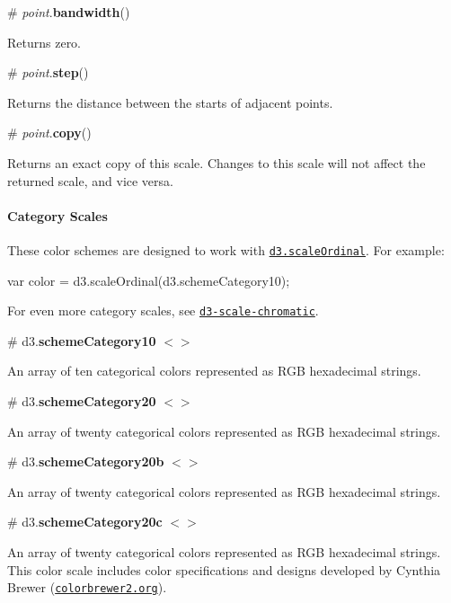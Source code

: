 \label{_point_bandwidth}%
\# {\itshape point}.{\bfseries bandwidth}()

Returns zero.

\label{_point_step}%
\# {\itshape point}.{\bfseries step}()

Returns the distance between the starts of adjacent points.

\label{_point_copy}%
\# {\itshape point}.{\bfseries copy}()

Returns an exact copy of this scale. Changes to this scale will not affect the returned scale, and vice versa.

\paragraph*{Category Scales}

These color schemes are designed to work with \href{#scaleOrdinal}{\tt d3.\+scale\+Ordinal}. For example\+:


\begin{DoxyCode}
var color = d3.scaleOrdinal(d3.schemeCategory10);
\end{DoxyCode}


For even more category scales, see \href{https://github.com/d3/d3-scale-chromatic}{\tt d3-\/scale-\/chromatic}.

\label{_schemeCategory10}%
\# d3.{\bfseries scheme\+Category10} \href{https://github.com/d3/d3-scale/blob/master/src/category10.js}{\tt $<$$>$}



An array of ten categorical colors represented as R\+GB hexadecimal strings.

\label{_schemeCategory20}%
\# d3.{\bfseries scheme\+Category20} \href{https://github.com/d3/d3-scale/blob/master/src/category20.js}{\tt $<$$>$}



An array of twenty categorical colors represented as R\+GB hexadecimal strings.

\label{_schemeCategory20b}%
\# d3.{\bfseries scheme\+Category20b} \href{https://github.com/d3/d3-scale/blob/master/src/category20b.js}{\tt $<$$>$}



An array of twenty categorical colors represented as R\+GB hexadecimal strings.

\label{_schemeCategory20c}%
\# d3.{\bfseries scheme\+Category20c} \href{https://github.com/d3/d3-scale/blob/master/src/category20c.js}{\tt $<$$>$}



An array of twenty categorical colors represented as R\+GB hexadecimal strings. This color scale includes color specifications and designs developed by Cynthia Brewer (\href{http://colorbrewer2.org/}{\tt colorbrewer2.\+org}). 